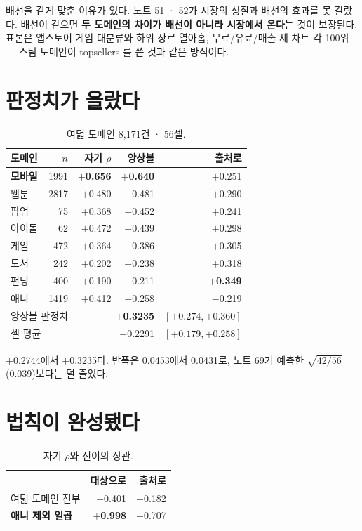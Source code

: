 \documentclass[10pt]{article}
\begin{document}
배선을 같게 맞춘 이유가 있다. 노트 51 · 52가 시장의 성질과 배선의 효과를 못
갈랐다. 배선이 같으면 \textbf{두 도메인의 차이가 배선이 아니라 시장에서 온다}는
것이 보장된다. 표본은 앱스토어 게임 대분류와 하위 장르 열아홉, 무료/유료/매출
세 차트 각 100위 --- 스팀 도메인이 topsellers 를 쓴 것과 같은 방식이다.

\section{판정치가 올랐다}

\begin{table}[t]
\centering\tsize
\caption{여덟 도메인 8,171건 · 56셀.}
\begin{tabular}{lrrrr}
\toprule
도메인 & $n$ & 자기 $\rho$ & 앙상블 & 출처로 \\
\midrule
\textbf{모바일} & 1991 & \textbf{$+$0.656} & \textbf{$+$0.640} & $+$0.251 \\
웹툰 & 2817 & $+$0.480 & $+$0.481 & $+$0.290 \\
팝업 & 75 & $+$0.368 & $+$0.452 & $+$0.241 \\
아이돌 & 62 & $+$0.472 & $+$0.439 & $+$0.298 \\
게임 & 472 & $+$0.364 & $+$0.386 & $+$0.305 \\
도서 & 242 & $+$0.202 & $+$0.238 & $+$0.318 \\
펀딩 & 400 & $+$0.190 & $+$0.211 & \textbf{$+$0.349} \\
애니 & 1419 & $+$0.412 & $-$0.258 & $-$0.219 \\
\midrule
\multicolumn{2}{l}{앙상블 판정치} & \multicolumn{2}{r}{\textbf{$+$0.3235}} &
$[+0.274, +0.360]$ \\
\multicolumn{2}{l}{셀 평균} & \multicolumn{2}{r}{$+$0.2291} &
$[+0.179, +0.258]$ \\
\bottomrule
\end{tabular}
\end{table}

$+$0.2744에서 $+$0.3235다. 반폭은 0.0453에서 0.0431로, 노트 69가 예측한
$\sqrt{42/56}$(0.039)보다는 덜 줄었다.

\section{법칙이 완성됐다}

\begin{table}[t]
\centering\tsize
\caption{자기 $\rho$와 전이의 상관.}
\begin{tabular}{lrr}
\toprule
& 대상으로 & 출처로 \\
\midrule
여덟 도메인 전부 & $+$0.401 & $-$0.182 \\
\textbf{애니 제외 일곱} & \textbf{$+$0.998} & $-$0.707 \\
\bottomrule
\end{tabular}
\end{table}
\end{document}
